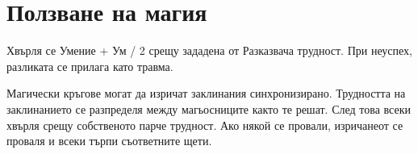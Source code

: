 \section{Ползване на магия}
Хвърля се Умение + Ум / 2 срещу зададена от Разказвача трудност. При
неуспех, разликата се прилага като травма.

Магически кръгове могат да изричат заклинания синхронизирано. Трудността
на заклинанието се разпределя между магьосниците както те решат. След това
всеки хвърля срещу собственото парче трудност. Ако някой се провали,
изричанеот се проваля и всеки търпи съответните щети.

%
%
%
%
%
%
%
%

